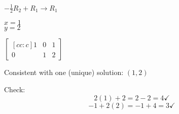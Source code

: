 \documentclass[letterpaper,12pt,fleqn]{article}
\begin{document}
\begin{example}
  \bigskip
  
  $-\frac{1}{2}R_2+R_1\rightarrow R_1$

  \begin{minipage}[t]{2in}
    \vspace{0pt}
    $x=1$ \\
    $y=2$
  \end{minipage}
  \begin{minipage}[t]{2in}
    \vspace{0pt}
    $\begin{bmatrix}[cc:c]
      1 & 0 & 1 \\
      0 & 1 & 2
    \end{bmatrix}$
  \end{minipage}

  Consistent with one (unique) solution: $(1,2)$

  Check:
  \[2(1)+2=2-2=4\checkmark\]
  \[-1+2(2)=-1+4=3\checkmark\]
\end{example}
\end{document}
